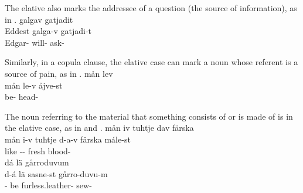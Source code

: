 The elative also marks the addressee of a question (the source of information), as in .
\ea\label{elat5}
\glll	{} galgav gatjadit\\
	Eddest galga-v gatjadi-t\\
	Edgar- will- ask-\\\nopagebreak
{} 
\z

Similarly, in a copula clause, the elative case can mark a noun whose referent is a source of pain, as in .
\ea\label{elat6}
\glll	mån lev \\
	mån le-v åjve-st\\
	 be- head-\\\nopagebreak
{} 
\z

The noun referring to the material that something consists of or is made of is in the elative case, as in  and . %
\ea\label{elat3}
\glll	mån iv tuhtje dav färska \\ %
	mån i-v tuhtje d-a-v färska mále-st\\ 
	  like\BS{} -- fresh blood-\\\nopagebreak
{} %
\z
\ea\label{elat4}
\glll	dá lä  gårroduvum\\
	d-á lä sasne-st gårro-duvu-m\\
	-\BS{} be\BS{} furless.leather- sew-\\\nopagebreak
{} 
\z


